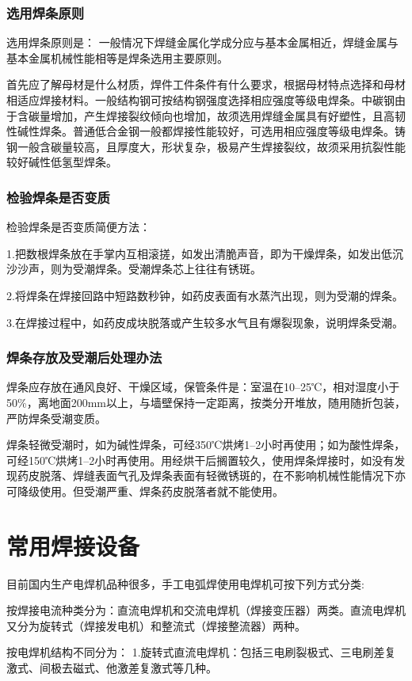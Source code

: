 \documentclass{ctexbook}
\begin{document}
\subsubsection{选用焊条原则}
选用焊条原则是：
一般情况下焊缝金属化学成分应与基本金属相近，焊缝金属与基本金属机械性能相等是焊条选用主要原则。

首先应了解母材是什么材质，焊件工件条件有什么要求，根据母材特点选择和母材相适应焊接材料。一般结构钢可按结构钢强度选择相应强度等级电焊条。中碳钢由于含碳量增加，产生焊接裂纹倾向也增加，故须选用焊缝金属具有好塑性，且高韧性碱性焊条。普通低合金钢一般都焊接性能较好，可选用相应强度等级电焊条。铸钢一般含碳量较高，且厚度大，形状复杂，极易产生焊接裂纹，故须采用抗裂性能较好碱性低氢型焊条。
\subsubsection{检验焊条是否变质}
检验焊条是否变质简便方法：

1.把数根焊条放在手掌内互相滚搓，如发出清脆声音，即为干燥焊条，如发出低沉沙沙声，则为受潮焊条。受潮焊条芯上往往有锈斑。

2.将焊条在焊接回路中短路数秒钟，如药皮表面有水蒸汽出现，则为受潮的焊条。

3.在焊接过程中，如药皮成块脱落或产生较多水气且有爆裂现象，说明焊条受潮。
\subsubsection{焊条存放及受潮后处理办法}
焊条应存放在通风良好、干燥区域，保管条件是：室温在10--25℃，相对湿度小于50\%，离地面200mm以上，与墙壁保持一定距离，按类分开堆放，随用随折包装，严防焊条受潮变质。

焊条轻微受潮时，如为碱性焊条，可经350℃烘烤1--2小时再使用；如为酸性焊条，可经150℃烘烤1--2小时再使用。用经烘干后搁置较久，使用焊条焊接时，如没有发现药皮脱落、焊缝表面气孔及焊条表面有轻微锈斑的，在不影响机械性能情况下亦可降级使用。但受潮严重、焊条药皮脱落者就不能使用。
\section{常用焊接设备}
目前国内生产电焊机品种很多，手工电弧焊使用电焊机可按下列方式分类:

按焊接电流种类分为：直流电焊机和交流电焊机（焊接变压器）两类。直流电焊机又分为旋转式（焊接发电机）和整流式（焊接整流器）两种。

按电焊机结构不同分为：
1.旋转式直流电焊机：包括三电刷裂极式、三电刷差复激式、间极去磁式、他激差复激式等几种。
\end{document}

